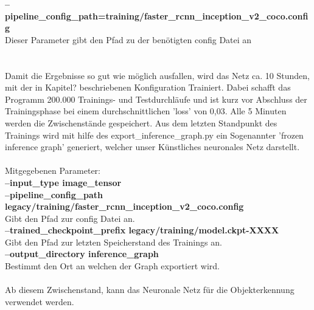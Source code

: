 \documentclass[a4paper,12pt,oneside]{article}
\begin{document}
\textbf{--pipeline\_config\_path=training/faster\_rcnn\_inception\_v2\_coco.config}\\
Dieser Parameter gibt den Pfad zu der benötigten config Datei an\\\\
\\
Damit die Ergebnisse so gut wie möglich ausfallen, wird das Netz ca. 10 Stunden, mit der in Kapitel? beschriebenen Konfiguration Trainiert. Dabei schafft das Programm 200.000 Trainings- und Testdurchläufe und ist kurz vor Abschluss der Trainingsphase bei einem durchschnittlichen 'loss' von 0,03. Alle 5 Minuten werden die Zwischenstände gespeichert. Aus dem letzten Standpunkt des Trainings wird mit hilfe des export\_inference\_graph.py  ein Sogenannter 'frozen inference graph' generiert, welcher unser Künstliches neuronales Netz darstellt.\\\\
Mitgegebenen Parameter:\\
\textbf{--input\_type image\_tensor}\\
\textbf{--pipeline\_config\_path legacy/training/faster\_rcnn\_inception\_v2\_coco.config}\\
Gibt den Pfad zur config Datei an.\\
\textbf{--trained\_checkpoint\_prefix legacy/training/model.ckpt-XXXX}\\
Gibt den Pfad zur letzten Speicherstand des Trainings an.\\
\textbf{--output\_directory inference\_graph}\\
Bestimmt den Ort an welchen der Graph exportiert wird.\\\\

Ab diesem Zwischenstand, kann das Neuronale Netz für die Objekterkennung verwendet werden.
  
\newpage
\end{document}
